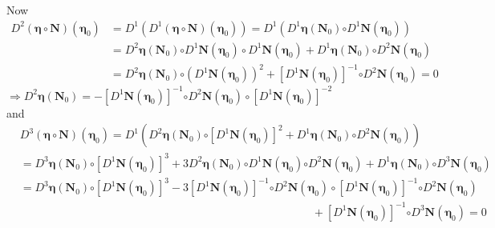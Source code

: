 \documentclass[aps,preprint]{revtex4}%
\begin{document}
Now
\begin{align}
D^{2}\left(  \mathbf{\eta\circ N}\right)  \left(  \mathbf{\eta}_{0}\right)
&  =D^{1}\left(  D^{1}\left(  \mathbf{\eta\circ N}\right)  \left(
\mathbf{\eta}_{0}\right)  \right)  =D^{1}\left(  D^{1}\mathbf{\eta}\left(
\mathbf{N}_{0}\right)  \mathbf{\circ}D^{1}\mathbf{N}\left(  \mathbf{\eta}%
_{0}\right)  \right) \nonumber\\
&  =D^{2}\mathbf{\eta}\left(  \mathbf{N}_{0}\right)  \mathbf{\circ}%
D^{1}\mathbf{N}\left(  \mathbf{\eta}_{0}\right)  \circ D^{1}\mathbf{N}\left(
\mathbf{\eta}_{0}\right)  +D^{1}\mathbf{\eta}\left(  \mathbf{N}_{0}\right)
\mathbf{\circ}D^{2}\mathbf{N}\left(  \mathbf{\eta}_{0}\right) \nonumber\\
&  =D^{2}\mathbf{\eta}\left(  \mathbf{N}_{0}\right)  \mathbf{\circ}\left(
D^{1}\mathbf{N}\left(  \mathbf{\eta}_{0}\right)  \right)  ^{2}+\left[
D^{1}\mathbf{N}\left(  \mathbf{\eta}_{0}\right)  \right]  ^{-1}\mathbf{\circ
}D^{2}\mathbf{N}\left(  \mathbf{\eta}_{0}\right)  =0
\end{align}%
\begin{equation}
\Rightarrow D^{2}\mathbf{\eta}\left(  \mathbf{N}_{0}\right)  =-\left[
D^{1}\mathbf{N}\left(  \mathbf{\eta}_{0}\right)  \right]  ^{-1}\mathbf{\circ
}D^{2}\mathbf{N}\left(  \mathbf{\eta}_{0}\right)  \circ\left[  D^{1}%
\mathbf{N}\left(  \mathbf{\eta}_{0}\right)  \right]  ^{-2}\qquad\qquad
\qquad\quad
\end{equation}
and
\begin{align}
&  D^{3}\left(  \mathbf{\eta\circ N}\right)  \left(  \mathbf{\eta}_{0}\right)
=D^{1}\left(  D^{2}\mathbf{\eta}\left(  \mathbf{N}_{0}\right)  \mathbf{\circ
}\left[  D^{1}\mathbf{N}\left(  \mathbf{\eta}_{0}\right)  \right]  ^{2}%
+D^{1}\mathbf{\eta}\left(  \mathbf{N}_{0}\right)  \mathbf{\circ}%
D^{2}\mathbf{N}\left(  \mathbf{\eta}_{0}\right)  \right) \nonumber\\
&  =D^{3}\mathbf{\eta}\left(  \mathbf{N}_{0}\right)  \mathbf{\circ}\left[
D^{1}\mathbf{N}\left(  \mathbf{\eta}_{0}\right)  \right]  ^{3}+3D^{2}%
\mathbf{\eta}\left(  \mathbf{N}_{0}\right)  \mathbf{\circ}D^{1}\mathbf{N}%
\left(  \mathbf{\eta}_{0}\right)  \mathbf{\circ}D^{2}\mathbf{N}\left(
\mathbf{\eta}_{0}\right)  +D^{1}\mathbf{\eta}\left(  \mathbf{N}_{0}\right)
\mathbf{\circ}D^{3}\mathbf{N}\left(  \mathbf{\eta}_{0}\right) \nonumber\\
&  =D^{3}\mathbf{\eta}\left(  \mathbf{N}_{0}\right)  \mathbf{\circ}\left[
D^{1}\mathbf{N}\left(  \mathbf{\eta}_{0}\right)  \right]  ^{3}-3\left[
D^{1}\mathbf{N}\left(  \mathbf{\eta}_{0}\right)  \right]  ^{-1}\mathbf{\circ
}D^{2}\mathbf{N}\left(  \mathbf{\eta}_{0}\right)  \circ\left[  D^{1}%
\mathbf{N}\left(  \mathbf{\eta}_{0}\right)  \right]  ^{-1}\mathbf{\circ}%
D^{2}\mathbf{N}\left(  \mathbf{\eta}_{0}\right) \nonumber\\
&  \qquad\qquad\qquad\qquad\qquad\qquad\qquad\qquad\qquad\qquad\qquad
\qquad\qquad+\left[  D^{1}\mathbf{N}\left(  \mathbf{\eta}_{0}\right)  \right]
^{-1}\mathbf{\circ}D^{3}\mathbf{N}\left(  \mathbf{\eta}_{0}\right)  =0
\end{align}%
\end{document}
